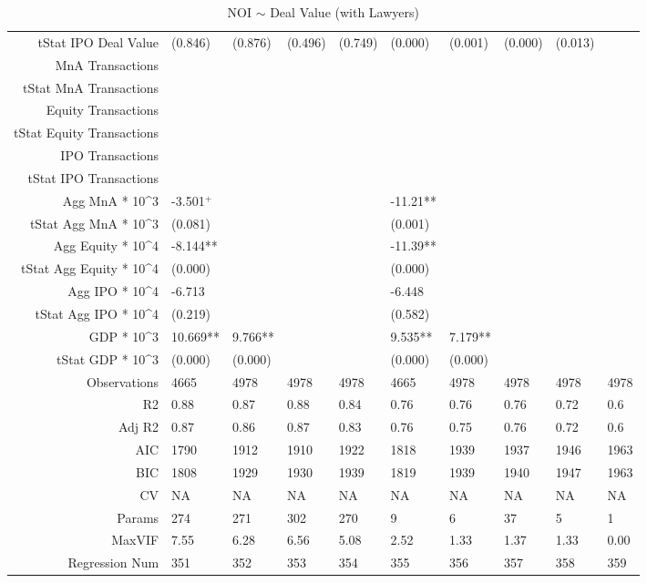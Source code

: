 \begin{table}[ht]
\begin{tabular}{rlllllllll}
  tStat IPO Deal Value & (0.846) & (0.876) & (0.496) & (0.749) & (0.000) & (0.001) & (0.000) & (0.013) &  \\ 
  MnA Transactions &  &  &  &  &  &  &  &  &  \\ 
  tStat MnA Transactions &  &  &  &  &  &  &  &  &  \\ 
  Equity Transactions &  &  &  &  &  &  &  &  &  \\ 
  tStat Equity Transactions &  &  &  &  &  &  &  &  &  \\ 
  IPO Transactions &  &  &  &  &  &  &  &  &  \\ 
  tStat IPO Transactions &  &  &  &  &  &  &  &  &  \\ 
  Agg MnA * 10^3 & -3.501$^{+}$ &  &  &  & -11.21** &  &  &  &  \\ 
  tStat Agg MnA * 10^3 & (0.081) &  &  &  & (0.001) &  &  &  &  \\ 
  Agg Equity * 10^4 & -8.144** &  &  &  & -11.39** &  &  &  &  \\ 
  tStat Agg Equity * 10^4 & (0.000) &  &  &  & (0.000) &  &  &  &  \\ 
  Agg IPO * 10^4 & -6.713 &  &  &  & -6.448 &  &  &  &  \\ 
  tStat Agg IPO * 10^4 & (0.219) &  &  &  & (0.582) &  &  &  &  \\ 
  GDP * 10^3 & 10.669** & 9.766** &  &  & 9.535** & 7.179** &  &  &  \\ 
  tStat GDP * 10^3 & (0.000) & (0.000) &  &  & (0.000) & (0.000) &  &  &  \\ 
  Observations & 4665 & 4978 & 4978 & 4978 & 4665 & 4978 & 4978 & 4978 & 4978 \\ 
  R2 & 0.88 & 0.87 & 0.88 & 0.84 & 0.76 & 0.76 & 0.76 & 0.72 & 0.6 \\ 
  Adj R2 & 0.87 & 0.86 & 0.87 & 0.83 & 0.76 & 0.75 & 0.76 & 0.72 & 0.6 \\ 
  AIC & 1790 & 1912 & 1910 & 1922 & 1818 & 1939 & 1937 & 1946 & 1963 \\ 
  BIC & 1808 & 1929 & 1930 & 1939 & 1819 & 1939 & 1940 & 1947 & 1963 \\ 
  CV & NA & NA & NA & NA & NA & NA & NA & NA & NA \\ 
  Params & 274 & 271 & 302 & 270 & 9 & 6 & 37 & 5 & 1 \\ 
  MaxVIF & 7.55 & 6.28 & 6.56 & 5.08 & 2.52 & 1.33 & 1.37 & 1.33 & 0.00 \\ 
  Regression Num & 351 & 352 & 353 & 354 & 355 & 356 & 357 & 358 & 359 \\ 
   \hline
\end{tabular}
\caption{NOI $\sim$ Deal Value (with Lawyers)} 
\end{table}

